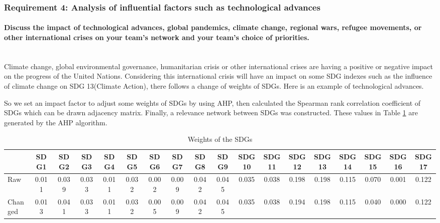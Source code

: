\documentclass[10pt]{mcmthesis}
\newcommand{\subsubsubsection}[1]{\paragraph{#1}\mbox{}\\}
\begin{document}

\subsubsection{Requirement 4: Analysis of influential factors such as technological advances}
\subsubsubsection{Discuss the impact of technological advances, global pandemics, climate change, regional wars, refugee movements, or other international crises on your team’s network and your team’s choice of priorities.}


 Climate change\cite{conway2010united}, global environmental governance\cite{kumar2020united}, humanitarian crisis\cite{omgba25topic} or other international crises are having a positive or negative impact on the progress of the United Nations. Considering this international crisis will have an impact on some SDG indexes such as the influence of climate change on SDG 13(Climate Action), there follows a change of weights of SDGs. Here is an example of technological advances.

 So we set an  impact factor to adjust some weights of SDGs by using AHP, then calculated the Spearman rank correlation coefficient of SDGs which can be drawn adjacency matrix. Finally, a relevance network between SDGs was constructed. These values in Table \ref{tab.weights of SDG}  are generated by the AHP algorithm. 

\begin{table}[h]\caption{ Weights of the SDGs }
\centering
\label{tab.weights of SDG}
\tiny
\tabcolsep=0.1cm
\begin{tabular}{lccccccccccccccccc}
\hline
\multicolumn{1}{c}{} & SDG1  & SDG2  & SDG3  & SDG4  & SDG5  & SDG6  & SDG7  & SDG8  & SDG9  & SDG10 & SDG11 & SDG12 & SDG13 & SDG14 & SDG15 & SDG16 & SDG17 \\ \hline
Raw                  & 0.011 & 0.039 & 0.033 & 0.011 & 0.032 & 0.002 & 0.009 & 0.042 & 0.045 & 0.035 & 0.038 & 0.198 & 0.198 & 0.115 & 0.070 & 0.001 & 0.122 \\
Changed              & 0.013 & 0.041 & 0.033 & 0.011 & 0.032 & 0.005 & 0.009 & 0.042 & 0.045 & 0.035 & 0.038 & 0.194 & 0.198 & 0.115 & 0.040 & 0.000 & 0.122 \\ \hline
\end{tabular}
\end{table}
\end{document}
